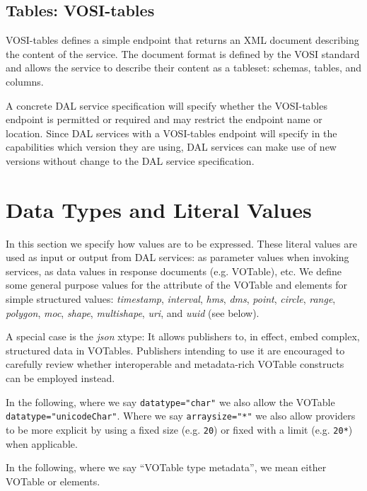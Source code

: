 \documentclass[11pt,letter]{ivoa}
\begin{document}
\subsection{Tables: VOSI-tables}
\label{sec:vosi-tables}
VOSI-tables \citep{2017ivoa.spec.0524G} defines a simple endpoint that returns an
XML document
describing the content of the service. The document format is defined by the
VOSI \citep{2017ivoa.spec.0524G} standard and allows the service to
describe their content
as a tableset: schemas, tables, and columns.

A concrete DAL service specification will specify whether the VOSI-tables endpoint is
permitted or required and may restrict the endpoint name or location.
Since DAL services with a VOSI-tables endpoint will specify
in the capabilities which version they are using, DAL services can make use of
new versions without change to the DAL service specification.

\section{Data Types and Literal Values}
\label{sec:xtypes}
In this section we specify how values are to be expressed. These literal values
are used as input or output from DAL services: as parameter values when
invoking services, as data values in response documents (e.g. VOTable),
etc. We define some general purpose values for the  attribute of
the VOTable  and  elements for simple
structured values: \emph{timestamp}, \emph{interval},
\emph{hms}, \emph{dms},
\emph{point}, \emph{circle}, \emph{range}, \emph{polygon}, \emph{moc},
\emph{shape}, \emph{multishape}, \emph{uri}, and \emph{uuid} (see below).

A special case is the \emph{json} xtype: It allows publishers to, in
effect, embed complex, structured data in VOTables.  Publishers
intending to use it are encouraged to carefully review whether
interoperable and metadata-rich VOTable constructs can be employed
instead.

In the following, where we say \verb|datatype="char"| we also allow the VOTable
\verb|datatype="unicodeChar"|. Where we say \verb|arraysize="*"| we also allow
providers to be more explicit by using a fixed size (e.g. \verb|20|) or fixed
with a limit (e.g. \verb|20*|) when applicable.

In the following, where we say ``VOTable type metadata'', we mean either VOTable
 or  elements.
\end{document}

